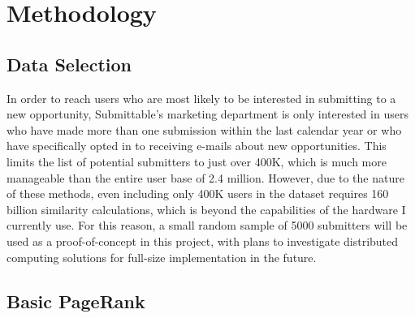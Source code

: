 \documentclass[]{report}   %
\begin{document}
\chapter{Methodology}

\section{Data Selection}

In order to reach users who are most likely to be interested in submitting to a new opportunity, Submittable's marketing department is only interested in users who have made more than one submission within the last calendar year or who have specifically opted in to receiving e-mails about new opportunities. This limits the list of potential submitters to just over 400K, which is much more manageable than the entire user base of 2.4 million. However, due to the nature of these methods, even including only 400K users in the dataset requires 160 billion similarity calculations, which is beyond the capabilities of the hardware I currently use. For this reason, a small random sample of 5000 submitters will be used as a proof-of-concept in this project, with plans to investigate distributed computing solutions for full-size implementation in the future.

\section{Basic PageRank}
\end{document}
